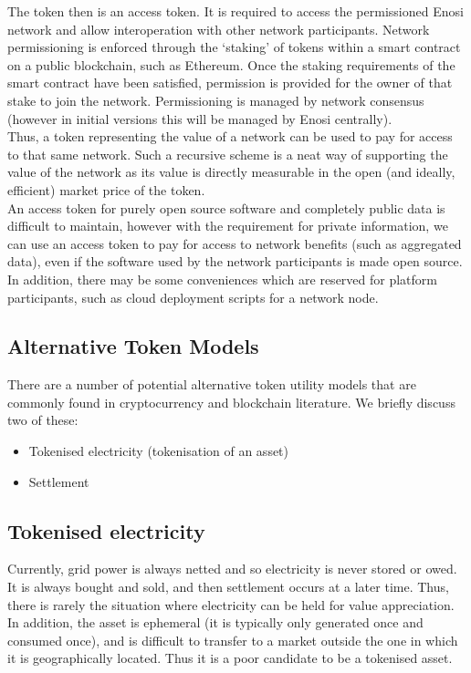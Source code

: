 \documentclass{article}
\theoremstyle{definition}
\theoremstyle{plain} %
\begin{document}
\noindent The token then is an access token. It is required to access the permissioned Enosi network and allow interoperation with other network participants. Network permissioning is enforced through the ‘staking’ of tokens within a smart contract on a public blockchain, such as Ethereum. Once the staking requirements of the smart contract have been satisfied, permission is provided for the owner of that stake to join the network. Permissioning is managed by network consensus (however in initial versions this will be managed by Enosi centrally).\\

\noindent Thus, a token representing the value of a network can be used to pay for access to that same network. Such a recursive scheme is a neat way of supporting the value of the network as its value is directly measurable in the open (and ideally, efficient) market price of the token.\\

\noindent An access token for purely open source software and completely public data is difficult to maintain, however with the requirement for private information, we can use an access token to pay for access to network benefits (such as aggregated data), even if the software used by the network participants is made open source. In addition, there may be some conveniences which are reserved for platform participants, such as cloud deployment scripts for a network node.

\subsection{Alternative Token Models}

There are a number of potential alternative token utility models that are commonly found in cryptocurrency and blockchain literature. We briefly discuss two of these:

\begin{itemize}
\item{Tokenised electricity (tokenisation of an asset)}
\item{Settlement}
\end{itemize}

\subsection{Tokenised electricity}

Currently, grid power is always netted and so electricity is never stored or owed. It is always bought and sold, and then settlement occurs at a later time. Thus, there is rarely the situation where electricity can be held for value appreciation. In addition, the asset is ephemeral (it is typically only generated once and consumed once), and is difficult to transfer to a market outside the one in which it is geographically located. Thus it is a poor candidate to be a tokenised asset.\\
\end{document}
